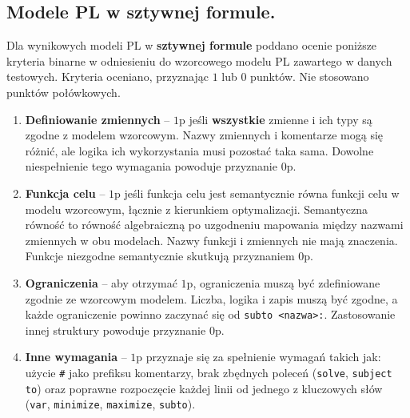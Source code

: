 


\subsection{Modele PL w sztywnej formule.}\label{ch:experiment:hardcoded}

Dla wynikowych modeli PL w \textbf{sztywnej formule} poddano ocenie poniższe kryteria binarne w odniesieniu do wzorcowego modelu PL zawartego w danych testowych. Kryteria oceniano, przyznając $1$ lub $0$ punktów. Nie stosowano punktów połówkowych.

\begin{enumerate}
\item \textbf{Definiowanie zmiennych} -- $1$p jeśli \textbf{wszystkie} zmienne i ich typy są zgodne z modelem wzorcowym. Nazwy zmiennych i komentarze mogą się różnić, ale logika ich wykorzystania musi pozostać taka sama. Dowolne niespełnienie tego wymagania powoduje przyznanie $0$p.
\item \textbf{Funkcja celu} -- $1$p jeśli funkcja celu jest semantycznie równa funkcji celu w modelu wzorcowym, łącznie z kierunkiem optymalizacji. Semantyczna równość to równość algebraiczną po uzgodneniu mapowania między nazwami zmiennych w obu modelach. Nazwy funkcji i zmiennych nie mają znaczenia. Funkcje niezgodne semantycznie skutkują przyznaniem $0$p.
\item \textbf{Ograniczenia} -- aby otrzymać $1$p, ograniczenia muszą być zdefiniowane zgodnie ze wzorcowym modelem. Liczba, logika i zapis muszą być zgodne, a każde ograniczenie powinno zaczynać się od \texttt{subto <nazwa>:}. Zastosowanie innej struktury powoduje przyznanie $0$p.
\item \textbf{Inne wymagania} -- $1$p przyznaje się za spełnienie wymagań takich jak: użycie \texttt{\#} jako prefiksu komentarzy, brak zbędnych poleceń (\texttt{solve}, \texttt{subject to}) oraz poprawne rozpoczęcie każdej linii od jednego z kluczowych słów (\texttt{var}, \texttt{minimize}, \texttt{maximize}, \texttt{subto}).
\end{enumerate}

